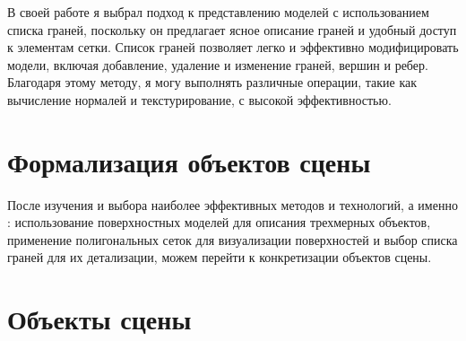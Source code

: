 В своей работе я выбрал подход к представлению моделей с использованием списка граней, поскольку он предлагает ясное описание граней и удобный доступ к элементам сетки. Список граней позволяет легко и эффективно модифицировать модели, включая добавление, удаление и изменение граней, вершин и ребер. Благодаря этому методу, я могу выполнять различные операции, такие как вычисление нормалей и текстурирование, с высокой эффективностью.




\section{Формализация объектов сцены}
 
После изучения и выбора наиболее эффективных методов и технологий, а именно : использование поверхностных моделей для описания трехмерных объектов, применение полигональных сеток для визуализации поверхностей и выбор списка граней для их детализации, можем перейти к конкретизации объектов сцены. 

\section*{Объекты сцены}

